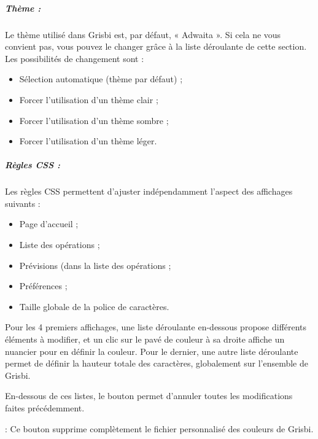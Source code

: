 \subparagraph{Thème :\label{setup-display-logo-theme}}

Le thème utilisé dans Grisbi est, par défaut, « Adwaita ». Si cela ne vous convient pas, vous pouvez le changer grâce à la liste déroulante de cette section. Les possibilités de changement sont :

\begin{itemize}
	\item Sélection automatique (thème par défaut) ;
	\item Forcer l'utilisation d'un thème clair ;
	\item Forcer l'utilisation d'un thème sombre ;	
	\item Forcer l'utilisation d'un thème léger.
\end{itemize}



\subparagraph{Règles CSS :\label{setup-display-logo-CSS}}

Les règles CSS permettent d'ajuster indépendamment l'aspect des affichages suivants :

\begin{itemize}
	\item Page d'accueil ;
	\item Liste des opérations ;
	\item Prévisions (dans la liste des opérations ;	
	\item Préférences ;
	\item Taille globale de la police de caractères.
\end{itemize}


Pour les 4 premiers affichages, une liste déroulante en-dessous propose différents éléments à modifier, et un clic sur le pavé de couleur à sa droite affiche un nuancier pour en définir la couleur. Pour le dernier, une autre liste déroulante permet de définir la hauteur totale des caractères, globalement sur l'ensemble de Grisbi.


En-dessous de ces listes, le bouton  permet d'annuler toutes les modifications faites précédemment. 

 : Ce bouton supprime complètement le fichier personnalisé des couleurs de Grisbi.



